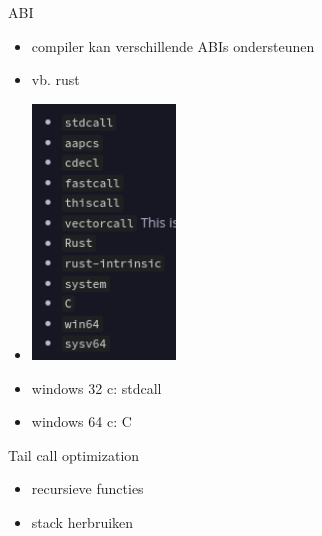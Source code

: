 \documentclass{beamer}
\begin{document}
\begin{frame}{ABI}
	\begin{itemize}
	    \item compiler kan verschillende ABIs ondersteunen
	    \item vb. rust
	    \item \includegraphics[width=0.3\textwidth]{abis.png}
	    \item windows 32 c: stdcall
	    \item windows 64 c: C
	\end{itemize}
\end{frame}

\begin{frame}{Tail call optimization}
	\begin{itemize}
	    \item recursieve functies
	    \item stack herbruiken
	\end{itemize}
\end{frame}
\end{document}
